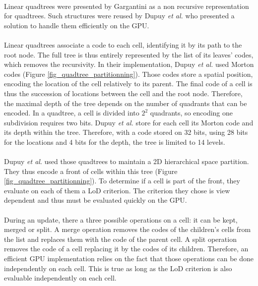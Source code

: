 \paragraph{}
Linear quadtrees were presented by Gargantini \cite{gargantini1982effective} as a non recursive representation for quadtrees.
Such structures were reused by Dupuy \textit{et al.} \cite{dupuy2014quadtrees} who presented a solution to handle them efficiently on the GPU.

\paragraph{}
Linear quadtrees associate a code to each cell, identifying it by its path to the root node.
The full tree is thus entirely represented by the list of its leaves' codes, which removes the recursivity.
In their implementation, Dupuy \textit{et al.} used Morton codes (Figure \ref{fig_quadtree_partitionning}).
Those codes store a spatial position, encoding the location of the cell relatively to its parent.
The final code of a cell is thus the succession of locations between the cell and the root node.
Therefore, the maximal depth of the tree depends on the number of quadrants that can be encoded.
In a quadtree, a cell is divided into $2^2$ quadrants, so encoding one subdivision requires two bits.
Dupuy \textit{et al.} store for each cell its Morton code and its depth within the tree.
Therefore, with a code stored on 32 bits, using 28 bits for the locations and 4 bits for the depth, the tree is limited to 14 levels.

\paragraph{}
Dupuy \textit{et al}. used those quadtrees to maintain a 2D hierarchical space partition.
They thus encode a front of cells within this tree (Figure \ref{fig_quadtree_partitionning}).
To determine if a cell is part of the front, they evaluate on each of them a LoD criterion.
The criterion they chose is view dependent and thus must be evaluated quickly on the GPU.

\paragraph{}
During an update, there a three possible operations on a cell: it can be kept, merged or split.
A merge operation removes the codes of the children's cells from the list and replaces them with the code of the parent cell.
A split operation removes the code of a cell replacing it by the codes of its children.
Therefore, an efficient GPU implementation relies on the fact that those operations can be done independently on each cell.
This is true as long as the LoD criterion is also evaluable independently on each cell.

